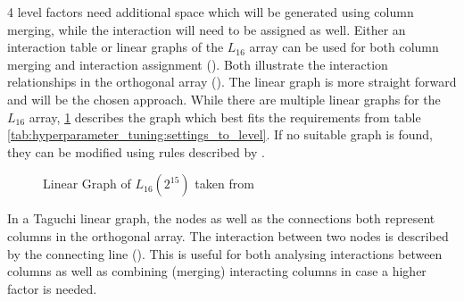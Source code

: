 4 level factors need additional space which will be generated using column merging, while the interaction will need to be assigned as well.
Either an interaction table or linear graphs of the $L_{16}$ array can be used for both column merging and interaction assignment (\cite{nazandanacioglu_taguchi_2005}). Both illustrate the interaction relationships in the orthogonal array (\cite{yang_design_2009}).
The linear graph is more straight forward and will be the chosen approach. While there are multiple linear graphs for the $L_{16}$ array, \ref{fig:hyperparameter_tuning:linear_graph} describes the graph which best fits the requirements from table \ref{tab:hyperparameter_tuning:settings_to_level}. If no suitable graph is found, they can be modified using rules described by \cite{nazandanacioglu_taguchi_2005}.

\begin{figure}[H]
	\label{fig:hyperparameter_tuning:linear_graph}
	\centering
{}
\caption{Linear Graph of $L_{16}(2^{15})$ taken from \cite{yang_design_2009}}
\end{figure}

In a Taguchi linear graph, the nodes as well as the connections both represent columns in the orthogonal array. The interaction between two nodes is described by the connecting line (\cite{taguchi_taguchis_2005}). This is useful for both analysing interactions between columns as well as combining (merging) interacting columns in case a higher factor is needed.

